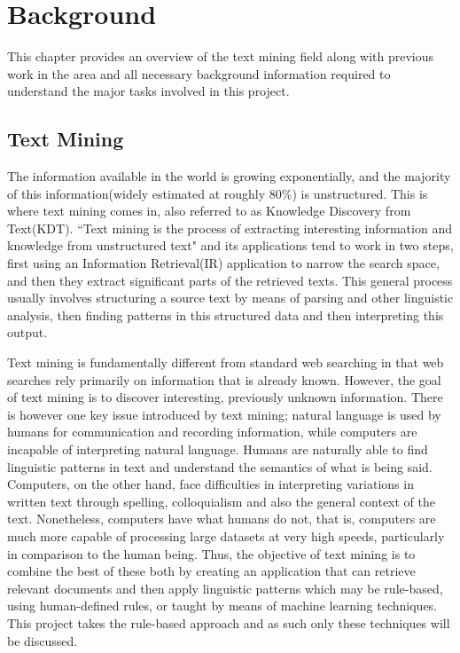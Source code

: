 \chapter{Background}
\label{cha:background}
This chapter provides an overview of the text mining field along with previous work in the area and all necessary background information required to understand the major tasks involved in this project.

\section{Text Mining}
\label{sec:textmining}
The information available in the world is growing exponentially, and the majority of this information(widely estimated at roughly 80\%) is unstructured. This is where text mining comes in, also referred to as Knowledge Discovery from Text(KDT).
``Text mining is the process of extracting interesting information and knowledge from unstructured text"\cite{hotho-etal-ldv-2005} and its applications tend to work in two steps, first using an Information Retrieval(IR) application to narrow the search space, and then they extract significant parts of the retrieved texts\cite{Polajnar2006}. This general process usually involves structuring a source text by means of parsing and other linguistic analysis, then finding patterns in this structured data and then interpreting this output.

Text mining is fundamentally different from standard web searching in that web searches rely primarily on information that is already known. However, the goal of text mining is to discover interesting, previously unknown information\cite{Gupta_Lehal_2009}.
There is however one key issue introduced by text mining; natural language is used by humans for communication and recording information, while computers are incapable of interpreting natural language. Humans are naturally able to find linguistic patterns in text and understand the semantics of what is being said. Computers, on the other hand, face difficulties in interpreting variations in written text through spelling, colloquialism and also the general context of the text. Nonetheless, computers have what humans do not, that is, computers are much more capable of processing large datasets at very high speeds, particularly in comparison to the human being. Thus, the objective of text mining is to combine the best of these both by creating an application that can retrieve relevant documents and then apply linguistic patterns which may be rule-based, using human-defined rules, or taught by means of machine learning techniques. This project takes the rule-based approach and as such only these techniques will be discussed.

